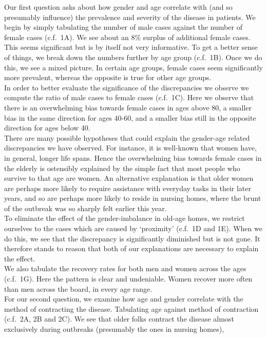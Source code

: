 \documentclass{article}
\begin{document}
Our first question asks about how gender and age correlate with (and so presumably influence)
the prevalence and severity of the disease in patients. 
We begin by simply tabulating the number of male cases against the number of female cases (c.f.\ 1A).
We see about an 8\% surplus of additional female cases.
This seems significant but is by itself not very informative.
To get a better sense of things, we break down the numbers further by age group (c.f.\ 1B).
Once we do this, we see a mixed picture. In certain age groups,
female cases seem significantly more prevalent, whereas the opposite 
is true for other age groups.\\
In order to better evaluate the significance of the discrepancies we observe
we compute the ratio of male cases to female cases (c.f.\ 1C).
Here we observe that there is an overwhelming bias towards female cases
in ages above 80, a smaller bias in the same direction for ages 40-60,
and a smaller bias still in the opposite direction for ages below 40.\\
There are many possible hypotheses that could explain the 
gender-age related discrepancies we have observed.
For instance, it is well-known that women have, in general, longer life spans.
Hence the overwhelming bias towards female cases in the elderly is
ostensibly explained by the simple fact that most people who survive to that
age are women. An alternative explanation is that older women are perhaps
more likely to require assistance with everyday tasks in their later years, and so are perhaps
more likely to reside in nursing homes, where the brunt of the outbreak was
so sharply felt earlier this year.\\
To eliminate the effect of the gender-imbalance in old-age homes, we 
restrict ourselves to the cases which are caused by `proximity' (c.f.\ 1D and 1E).
When we do this, we see that the discrepancy is significantly diminished but is not gone.
It therefore stands to reason that both of our explanations are necessary to explain the effect.\\
We also tabulate the recovery rates for both men and women across the ages (c.f.\ 1G).
Here the pattern is clear and undeniable. Women recover more often than men across the board, 
in every age range.
\bigskip\\
For our second question, we examine how age and gender correlate with the method of contracting the disease.
Tabulating age against method of contraction (c.f.\ 2A, 2B and 2C).
We see that older folks contract the disease almost exclusively during outbreaks (presumably the ones in nursing homes),
\end{document}
